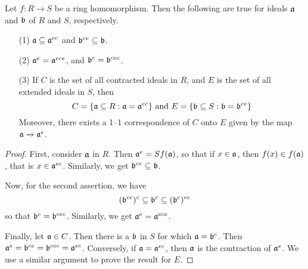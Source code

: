 \begin{proposition}\label{proposition_5.6.4}
    Let $f:R \xrightarrow{} S$ be a ring homomorphism. Then the following are
    true for ideals $\af$ and  $\bf$ of  $R$ and  $S$, respectively.
    \begin{enumerate}
        \item[(1)] $\af \subseteq \af^{ec}$ and $\bf^{ce} \subseteq \bf$.

        \item[(2)] $\af^e=\af^{ece}$, and $\bf^c=\bf^{cec}$.

        \item[(3)] If $C$ is the set of all contracted ideals in $R$, and  $E$
            is the set of all extended ideals in  $S$, then
            \begin{equation*}
                C=\{\af \subseteq R : \af=\af^{ec}\} \text{ and }
                E=\{\bf \subseteq S : \bf=\bf^{ce}\}
            \end{equation*}
            Moreover, there exists a 1--1 correspondence of $C$ onto $E$  given
            by the map $\af \xrightarrow{} \af^e$.
    \end{enumerate}
\end{proposition}
\begin{proof}
    First, consider $\af$ in  $R$. Then  $\af^e=Sf(\af)$, so that if $x \in
    \af$, then  $f(x) \in f(\af)$, that is $x \in \af^{ec}$. Similarly, we
    get $\bf^{ce} \subseteq \bf$.

    Now, for the second assertion, we have
    \begin{equation*}
        (\bf^{ce})^c \subseteq \bf^c \subseteq (\bf^c)^{ec}
    \end{equation*}
    so that $\bf^c=\bf^{cec}$. Similarly, we get $\af^e=\af^{ece}$.

    Finally, let $\af \in C$. Then there is a $\bf$ in $S$ for which
    $\af=\bf^c$. Then  $\af^e=\bf^{ce}=\bf^{cec}=\af^{ec}$. Conversely, if
    $\af=\af^{ec}$, then $\af$ is the contraction of $\af^e$. We use a similar
    argument to prove the result for $E$.
\end{proof}

